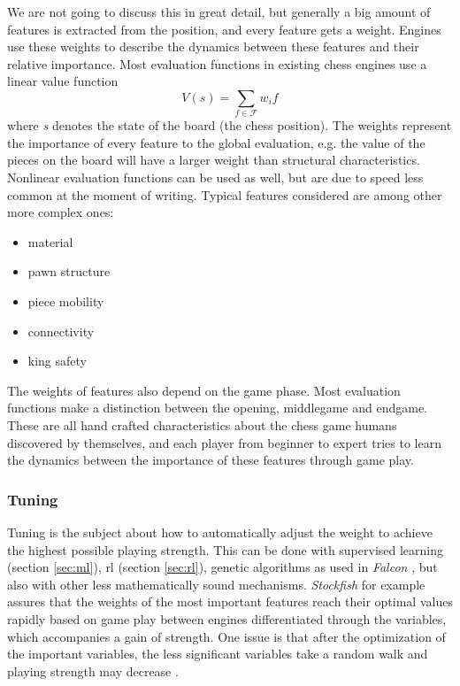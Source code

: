 We are not going to discuss this in great detail, but generally a big amount of features is extracted from the position, and every feature gets a weight. Engines use these weights to describe the dynamics between these features and their relative importance. Most evaluation functions in existing chess engines use a linear value function
\begin{equation}
V({s})=\sum_{f \in \mathcal{F}} w_i f 
\end{equation}
where \textit{s} denotes the state of the board (the chess position). The weights represent the importance of every feature to the global evaluation, e.g. the value of the pieces on the board will have a larger weight than structural characteristics. Nonlinear evaluation functions can be used as well, but are due to speed less common at the moment of writing. Typical features considered are among other more complex ones:
\begin{itemize}
\item material
\item pawn structure
\item piece mobility
\item connectivity
\item king safety
\end{itemize}
The weights of features also depend on the game phase. Most evaluation functions make a distinction between the opening, middlegame and endgame. These are all hand crafted characteristics about the chess game humans discovered by themselves, and each player from beginner to expert tries to learn the dynamics between the importance of these features through game play.

\subsubsection*{Tuning}
Tuning is the subject about how to automatically adjust the weight to achieve the highest possible playing strength. This can be done with supervised learning (section \ref{sec:ml}), \acrlong{rl} (section \ref{sec:rl}), genetic algorithms as used in \textit{Falcon} \cite{tabib09}, but also with other less mathematically sound mechanisms. \textit{Stockfish} for example assures that the weights of the most important features reach their optimal values rapidly based on game play between engines differentiated through the variables, which accompanies a gain of strength. One issue is that after the optimization of the important variables, the less significant variables take a random walk and playing strength may decrease \cite{joona11}.\\


